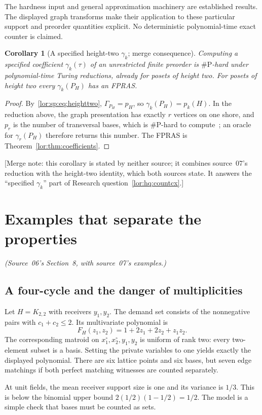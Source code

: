 \documentclass[11pt]{article}
\numberwithin{equation}{section}
\newtheorem{corollary}[theorem]{Corollary}
\theoremstyle{definition}
\begin{document}
The hardness input and general approximation machinery are established
results. The displayed graph transforms make their application to these
particular support and preorder quantities explicit. No deterministic
polynomial-time exact counter is claimed.

\begin{corollary}[A specified height-two $\gamma_k$; merge consequence]
\label{lor:cor:gammahard}
Computing a specified coefficient $\gamma_k(\tau)$ of an unrestricted finite
preorder is $\#\mathrm P$-hard under polynomial-time Turing reductions,
already for posets of height two. For posets of height two every
$\gamma_k(P_H)$ has an FPRAS.
\end{corollary}
\begin{proof}
By~\eqref{lor:sp:eq:heighttwo}, $\Gamma_{P_H}=p_H$, so
$\gamma_k(P_H)=p_k(H)$. In the reduction above, the graph presentation has
exactly $r$ vertices on one shore, and $p_r$ is the number of transversal
bases, which is $\#\mathrm P$-hard to compute~\cite{CPV}; an oracle for
$\gamma_r(P_H)$ therefore returns this number. The FPRAS is
Theorem~\ref{lor:thm:coefficients}.
\end{proof}
[Merge note: this corollary is stated by neither source; it combines
source~07's reduction with the height-two identity, which both sources
state. It answers the ``specified $\gamma_k$'' part of Research
question~\ref{lor:hq:countcx}.]

\section{Examples that separate the properties}
\label{lor:sec:examples}
\noindent\emph{(Source~06's Section~8, with source~07's examples.)}
\subsection{A four-cycle and the danger of multiplicities}
Let $H=K_{2,2}$ with receivers $y_1,y_2$. The demand set consists of the
nonnegative pairs with $c_1+c_2\le2$. Its multivariate polynomial is
\[
 F_H(z_1,z_2)=1+2z_1+2z_2+z_1z_2.
\]
The corresponding matroid on $x_1^\circ,x_2^\circ,y_1,y_2$ is uniform of
rank two: every two-element subset is a basis. Setting the private
variables to one yields exactly the displayed polynomial. There are six
lattice points and six bases, but seven edge matchings if both perfect
matching witnesses are counted separately.

At unit fields, the mean receiver support size is one and its variance is
$1/3$. This is below the binomial upper bound $2(1/2)(1-1/2)=1/2$.
The model is a simple check that bases must be counted as sets.
\end{document}
